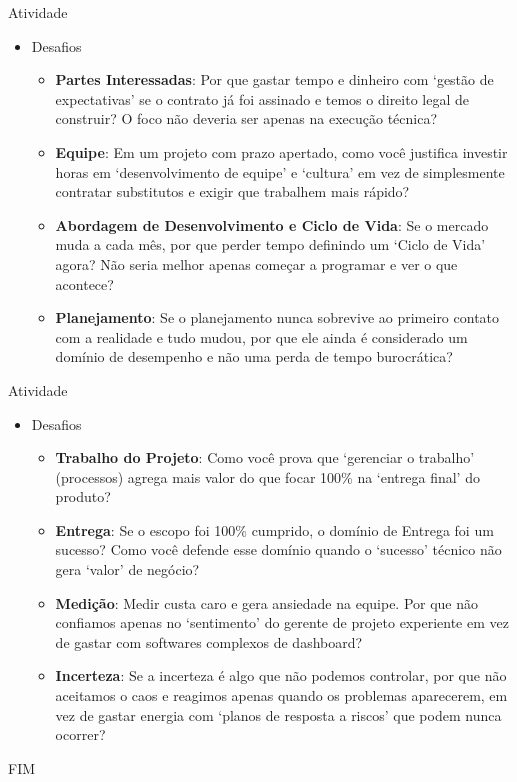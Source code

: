 \documentclass{beamer}
\begin{document}
\begin{frame}{Atividade}
	\begin{itemize}
		\item Desafios
		\begin{itemize}
			\justifying
			\item \textbf{Partes Interessadas}: Por que gastar tempo e dinheiro com `gestão de expectativas' se o contrato já foi assinado e temos o direito legal de construir? O foco não deveria ser apenas na execução técnica?
			\item \textbf{Equipe}: Em um projeto com prazo apertado, como você justifica investir horas em `desenvolvimento de equipe' e `cultura' em vez de simplesmente contratar substitutos e exigir que trabalhem mais rápido?
			\item \textbf{Abordagem de Desenvolvimento e Ciclo de Vida}: Se o mercado muda a cada mês, por que perder tempo definindo um `Ciclo de Vida' agora? Não seria melhor apenas começar a programar e ver o que acontece?
			\item \textbf{Planejamento}: Se o planejamento nunca sobrevive ao primeiro contato com a realidade e tudo mudou, por que ele ainda é considerado um domínio de desempenho e não uma perda de tempo burocrática?
		\end{itemize}
	\end{itemize}
\end{frame}

\begin{frame}{Atividade}
	\begin{itemize}
		\item Desafios
		\begin{itemize}
			\justifying
			\item \textbf{Trabalho do Projeto}: Como você prova que `gerenciar o trabalho' (processos) agrega mais valor do que focar 100\% na `entrega final' do produto?
			\item \textbf{Entrega}: Se o escopo foi 100\% cumprido, o domínio de Entrega foi um sucesso? Como você defende esse domínio quando o `sucesso' técnico não gera `valor' de negócio?
			\item \textbf{Medição}: Medir custa caro e gera ansiedade na equipe. Por que não confiamos apenas no `sentimento' do gerente de projeto experiente em vez de gastar com softwares complexos de dashboard?
			\item \textbf{Incerteza}: Se a incerteza é algo que não podemos controlar, por que não aceitamos o caos e reagimos apenas quando os problemas aparecerem, em vez de gastar energia com `planos de resposta a riscos' que podem nunca ocorrer?
		\end{itemize}
	\end{itemize}
\end{frame}


\begin{frame}
    \centering
    \Large
    FIM
\end{frame}
    
\end{document}
